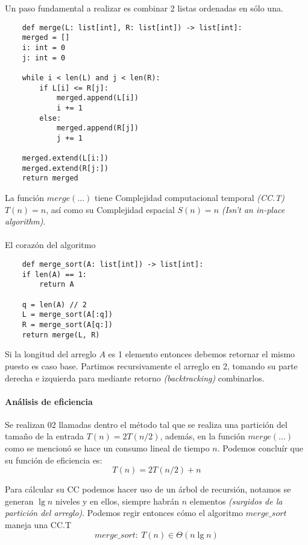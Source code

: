 \documentclass[tikz,11pt,fleqn]{book} %
\begin{document}
Un paso fundamental a realizar es combinar 2 listas ordenadas en sólo una. 
\begin{lstlisting}
    def merge(L: list[int], R: list[int]) -> list[int]:
    merged = []
    i: int = 0
    j: int = 0

    while i < len(L) and j < len(R):
        if L[i] <= R[j]:
            merged.append(L[i])
            i += 1
        else:
            merged.append(R[j])
            j += 1

    merged.extend(L[i:])
    merged.extend(R[j:])
    return merged
\end{lstlisting}
La función $merge(...)$ tiene Complejidad computacional temporal \textit{(CC.T)} $T(n)=n$, así como su Complejidad espacial $S(n)=n$ \textit{(Isn't an in-place algorithm)}.
\\\\
El corazón del algoritmo
\begin{lstlisting}
    def merge_sort(A: list[int]) -> list[int]:
    if len(A) == 1:
        return A

    q = len(A) // 2
    L = merge_sort(A[:q])
    R = merge_sort(A[q:])
    return merge(L, R)
\end{lstlisting}
Si la longitud del arreglo $A$ es 1 elemento entonces debemos retornar el mismo puesto es caso base.
Partimos recursivamente el arreglo en 2, tomando su parte derecha e izquierda para mediante retorno \textit{(backtracking)} combinarlos.

\paragraph{Análisis de eficiencia}
Se realizan 02 llamadas dentro el método tal que se realiza una partición del tamaño de la entrada $T(n)=2T(n/2)$, además, en la función $merge(...)$ como se mencionó se hace un consumo lineal de tiempo $n$. Podemos concluír que su función de eficiencia es:
$$ T(n) = 2T(n/2)+n $$

Para cálcular su CC podemos hacer uso de un árbol de recursión, notamos se generan $\lg n$ niveles y en ellos, siempre habrán $n$ elementos \textit{(surgidos de la partición del arreglo)}. Podemos regir entonces cómo el algoritmo $merge\_sort$ maneja una CC.T
$$ merge\_sort:~T(n)\in \Theta(n\lg n) $$
\end{document}
